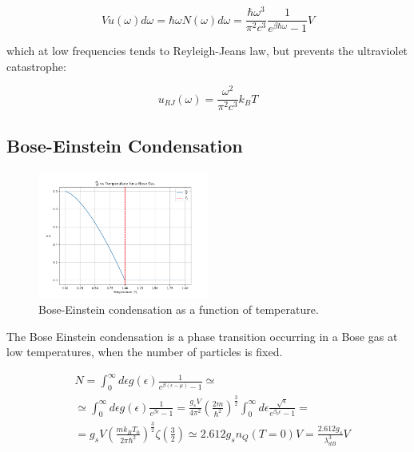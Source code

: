 \documentclass{article}
\begin{document}
\begin{equation}
    V u(\omega)d\omega=\hbar \omega N(\omega)d\omega=\frac{\hbar \omega^3}{\pi^2c^3}\frac{1}{e^{\beta\hbar\omega}-1}V
\end{equation}

which at low frequencies tends to Reyleigh-Jeans law, but prevents the ultraviolet catastrophe:

\begin{equation}
    u_{RJ}(\omega)=\frac{ \omega^2}{\pi^2c^3}k_BT
\end{equation}


\subsection{Bose-Einstein Condensation}

\begin{figure}[h]
    \centering
    \includegraphics[width=0.5\textwidth]{images/bose-einstein-condensation.png}
    \caption{Bose-Einstein condensation as a function of temperature.}
    \label{fig:bose-einstein-condensation}
\end{figure}

The Bose Einstein condensation is a phase transition occurring in a Bose gas at low temperatures,
when the number of particles is fixed.

\begin{equation}
    \begin{aligned}
         & N=\int_0^\infty d\epsilon g(\epsilon)\frac{1}{e^{\beta(\epsilon-\mu)}-1}\simeq                                                                                                                                  \\
         & \simeq \int_0^\infty d\epsilon g(\epsilon)\frac{1}{e^{\beta \epsilon}-1}=\frac{g_sV}{4\pi^2}\left(\frac{2m}{\hbar^2}\right)^{\frac{3}{2}}\int_0^\infty d\epsilon \frac{\sqrt{\epsilon}}{e^{\beta_0\epsilon}-1}= \\
         & =g_sV\left(\frac{mk_BT_0}{2\pi\hbar^2}\right)^{\frac{3}{2}}\zeta\left(\frac{3}{2}\right)\simeq 2.612 g_s n_Q(T=0) V= \frac{2.612 g_s}{\lambda_{dB}^3}V
    \end{aligned}
\end{equation}
\end{document}
